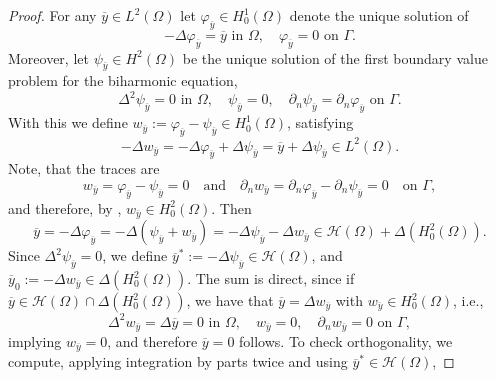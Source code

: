 \documentclass{article}
\numberwithin{equation}{section}
\begin{document}
\begin{proof}
  For any $\overline{y} \in L^2(\Omega)$ let
  $\varphi_{\overline{y}}\in H^1_0(\Omega)$ denote the unique solution of 
  \begin{equation*}
    -\Delta \varphi_{\overline{y}} = \overline{y} \text{ in } \Omega, \quad
    \varphi_{\overline{y}} = 0 \text{ on } \Gamma.  
  \end{equation*}
  Moreover, let $\psi_{\overline{y}} \in H^2(\Omega)$ be the unique solution of
  the first boundary value problem for the biharmonic equation,
  \begin{equation*}
    \Delta^2 \psi_{\overline{y}} = 0 \text{ in } \Omega, \quad
    \psi_{\overline{y}} =0, \quad \partial_n \psi_{\overline{y}} =
    \partial_n \varphi_{\overline{y}} \text{ on } \Gamma. 
  \end{equation*}
  With this we define 
  $w_{\overline{y}} := \varphi_{\overline{y}} - \psi_{\overline{y}} \in
  H^1_0(\Omega)$, satisfying  
  \begin{equation*}
    -\Delta w_{\overline{y}} =
    -\Delta \varphi_{\overline{y}} + \Delta \psi_{\overline{y}} =
    \overline{y} + \Delta \psi_{\overline{y}} \in L^2(\Omega).
  \end{equation*}
  Note, that the traces are  
  \begin{equation*}
    w_{\overline{y}} =
    \varphi_{\overline{y}} - \psi_{\overline{y}} = 0 \quad \text{and} \quad
    \partial_n w_{\overline{y}} =
    \partial_n \varphi_{\overline{y}} - \partial_n \psi_{\overline{y}} = 0
    \quad \text{on } \Gamma,
  \end{equation*}
  and therefore, by \cite[Cor. 4.2]{BehrndtMicheler2014JFA},
  $w_{\overline{y}} \in H_0^2(\Omega)$. Then
  \begin{equation*}
    \overline{y} = - \Delta \varphi_{\overline{y}} =
    - \Delta (\psi_{\overline{y}}+w_{\overline{y}}) =
    - \Delta \psi_{\overline{y}} - \Delta w_{\overline{y}} \in
    \mathcal{H}(\Omega) + \Delta(H_0^2(\Omega)).
  \end{equation*}
  Since
  $\Delta^2 \psi_{\overline{y}} =0$,
  we define $\overline{y}^\ast := - \Delta \psi_{\overline{y}} \in
  {\mathcal{H}}(\Omega)$, and
  $\overline{y}_0 := - \Delta w_{\overline{y}} \in \Delta(H_0^2(\Omega))$.
  The sum is direct, since if
  $\overline{y} \in \mathcal{H}(\Omega) \cap \Delta(H_0^2(\Omega))$, we have
  that $\overline{y} = \Delta w_{\overline{y}}$ with
  $w_{\overline{y}}\in H^2_0(\Omega)$, i.e.,
  \begin{equation*}
    \Delta^2 w_{\overline{y}} =
    \Delta \overline{y} = 0 \text{ in } \Omega, \quad
    w_{\overline{y}}=0,\quad \partial_nw_{\overline{y}} =0 \text{ on }\Gamma, 
  \end{equation*}
  implying $w_{\overline{y}}=0$, and therefore $\overline{y}=0$ follows.
  To check orthogonality, we compute, applying integration by parts twice
  and using $\overline{y}^\ast \in {\mathcal{H}}(\Omega)$,


\end{proof}
\end{document}
